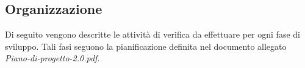 \documentclass[a4paper,11pt]{article}
\begin{document}
\subsection{Organizzazione}
Di seguito vengono descritte le attività di verifica da effettuare per ogni fase di sviluppo. Tali fasi seguono la pianificazione definita nel documento allegato \textit{Piano-di-progetto-2.0.pdf}.
\end{document}

